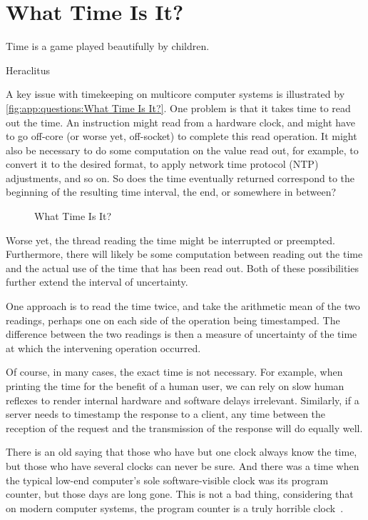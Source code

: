 
\section{What Time Is It?}
\label{sec:app:questions:What Time Is It?}
%
\epigraph{Time is a game played beautifully by children.}
	 {Heraclitus}

A key issue with timekeeping on multicore computer systems is illustrated
by \cref{fig:app:questions:What Time Is It?}.
One problem is that it takes time to read out the time.
An instruction might read from a hardware clock, and might
have to go off-core (or worse yet, off-socket) to complete
this read operation.
It might also be necessary to do some computation on the value read out,
for example, to convert it to the desired format, to apply network time
protocol (NTP) adjustments, and so on.
So does the time eventually returned correspond to the beginning of
the resulting time interval, the end, or somewhere in between?

\begin{figure}
\centering
{}
\caption{What Time Is It?}
\end{figure}

Worse yet, the thread reading the time might be interrupted or preempted.
Furthermore, there will likely be some computation between reading out
the time and the actual use of the time that has been read out.
Both of these possibilities further extend the interval of uncertainty.

One approach is to read the time twice, and take the arithmetic mean
of the two readings, perhaps one on each side of the operation being
timestamped.
The difference between the two readings is then a measure of uncertainty
of the time at which the intervening operation occurred.

Of course, in many cases, the exact time is not necessary.
For example, when printing the time for the benefit of a human user,
we can rely on slow human reflexes to render internal hardware and
software delays irrelevant.
Similarly, if a server needs to timestamp the response to a client, any
time between the reception of the request and the transmission of the
response will do equally well.

There is an old saying that those who have but one clock always
know the time, but those who have several clocks can never be sure.
And there was a time when the typical low-end computer's sole
software-visible clock was its program counter, but those days are
long gone.
This is not a bad thing, considering that on modern computer systems,
the program counter is a truly horrible
clock~\cite{PeterOkech2009InherentRandomness}.

